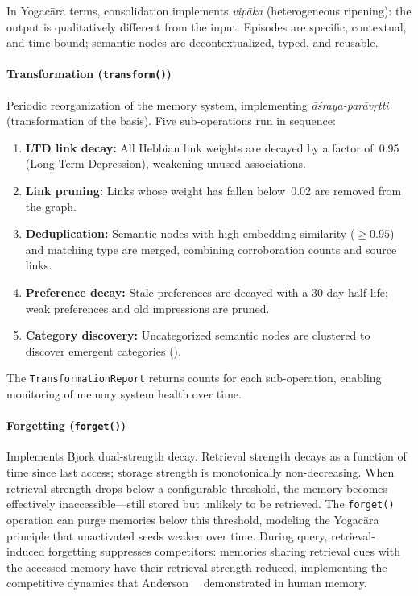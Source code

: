 In Yogac\=ara terms, consolidation implements \emph{vip\=aka}
(heterogeneous ripening): the output is qualitatively different from the
input. Episodes are specific, contextual, and time-bound; semantic nodes
are decontextualized, typed, and reusable.

\paragraph{Transformation (\texttt{transform()})}
Periodic reorganization of the memory system, implementing
\emph{\=a\'sraya-par\=av\d{r}tti} (transformation of the basis). Five
sub-operations run in sequence:
\begin{enumerate}[nosep]
    \item \textbf{LTD link decay:} All Hebbian link weights are decayed by
    a factor of~0.95 (Long-Term Depression), weakening unused associations.
    \item \textbf{Link pruning:} Links whose weight has fallen below~0.02
    are removed from the graph.
    \item \textbf{Deduplication:} Semantic nodes with high embedding
    similarity ($\geq 0.95$) and matching type are merged, combining
    corroboration counts and source links.
    \item \textbf{Preference decay:} Stale preferences are decayed with a
    30-day half-life; weak preferences and old impressions are pruned.
    \item \textbf{Category discovery:} Uncategorized semantic nodes are
    clustered to discover emergent categories ().
\end{enumerate}
The \texttt{TransformationReport} returns counts for each sub-operation,
enabling monitoring of memory system health over time.

\paragraph{Forgetting (\texttt{forget()})}
Implements Bjork dual-strength decay. Retrieval strength decays as a
function of time since last access; storage strength is monotonically
non-decreasing. When retrieval strength drops below a configurable
threshold, the memory becomes effectively inaccessible---still stored but
unlikely to be retrieved. The \texttt{forget()} operation can purge
memories below this threshold, modeling the Yogac\=ara principle that
unactivated seeds weaken over time. During query, retrieval-induced
forgetting suppresses competitors: memories sharing retrieval cues with
the accessed memory have their retrieval strength reduced, implementing
the competitive dynamics that Anderson~\etal~\cite{anderson1994}
demonstrated in human memory.

